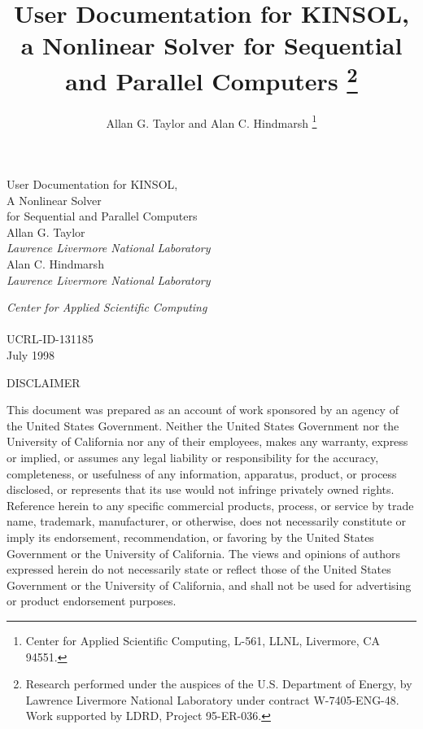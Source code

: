 \documentclass[11pt]{article}
\title{User Documentation for KINSOL, a Nonlinear Solver for Sequential and 
Parallel Computers%
\thanks{
Research performed under the auspices of the U.S.
Department of Energy, by Lawrence Livermore National Laboratory under
contract W-7405-ENG-48.  Work supported by LDRD, Project 95-ER-036.} }
\author{Allan G. Taylor and Alan C. Hindmarsh%
\thanks{Center for Applied Scientific Computing, L-561,
        LLNL, Livermore, CA 94551.} }
\begin{document}
\thispagestyle{empty}

\vspace{2in}
\begin{center}
  {\LARGE
    User Documentation for KINSOL, \\ 
    A Nonlinear Solver \\
    for Sequential and Parallel Computers
    }
  \\
  \vspace{1in}
  {\large Allan G. Taylor}\\
  {\large\em Lawrence Livermore National Laboratory}\\
  \vspace{0.25in}
  {\large Alan C. Hindmarsh}\\
  {\large\em Lawrence Livermore National Laboratory}
\end{center}  
\vfill
{\large\it Center for Applied Scientific Computing}\\
\vspace{0.7in}\\
{\large UCRL-ID-131185}\\
{\large July 1998}

\newpage

\thispagestyle{empty}


\vspace*{1.0in}
\scriptsize
\begin{center}
\begin{minipage}{4.0in}
\begin{center}
DISCLAIMER
\end{center}
This document was prepared as an account of work sponsored by an
agency of the United States Government.
Neither the United States Government nor the University of California
nor any of their employees, makes any warranty, express or implied, or
assumes any legal liability or responsibility for the accuracy,
completeness, or usefulness of any information, apparatus, product, or
process disclosed, or represents that its use would not infringe
privately owned rights.
Reference herein to any specific commercial products, process, or
service by trade name, trademark, manufacturer, or otherwise, does not
necessarily constitute or imply its endorsement, recommendation, or
favoring by the United States Government or the University of
California.
The views and opinions of authors expressed herein do not necessarily
state or reflect those of the United States Government or the
University of California, and shall not be used for advertising or
product endorsement purposes.  
\par\vspace*{1.0in}
\end{minipage}
\end{center}
\end{document}

